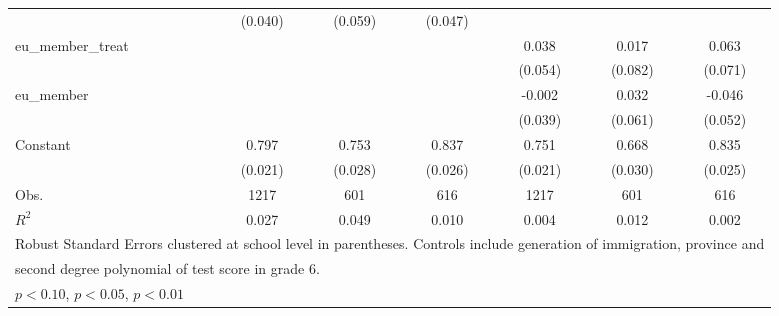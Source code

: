 \begin{table}[htbp]
\begin{tabular}{l*{6}{c}}
                    &     (0.040)         &     (0.059)         &     (0.047)         &                     &                     &                     \\
eu\_member\_treat     &                     &                     &                     &       0.038         &       0.017         &       0.063         \\
                    &                     &                     &                     &     (0.054)         &     (0.082)         &     (0.071)         \\
eu\_member           &                     &                     &                     &      -0.002         &       0.032         &      -0.046         \\
                    &                     &                     &                     &     (0.039)         &     (0.061)         &     (0.052)         \\
Constant            &       0.797\sym{***}&       0.753\sym{***}&       0.837\sym{***}&       0.751\sym{***}&       0.668\sym{***}&       0.835\sym{***}\\
                    &     (0.021)         &     (0.028)         &     (0.026)         &     (0.021)         &     (0.030)         &     (0.025)         \\
\midrule
Obs.                &        1217         &         601         &         616         &        1217         &         601         &         616         \\
\(R^{2}\)           &       0.027         &       0.049         &       0.010         &       0.004         &       0.012         &       0.002         \\
\bottomrule
\multicolumn{7}{l}{\footnotesize Robust Standard Errors clustered at school level in parentheses. Controls include generation of immigration, province and }\\
\multicolumn{7}{l}{\footnotesize second degree polynomial of test score in grade 6.}\\
\multicolumn{7}{l}{\footnotesize \sym{*} \(p<0.10\), \sym{**} \(p<0.05\), \sym{***} \(p<0.01\)}\\
\end{tabular}
\end{table}
